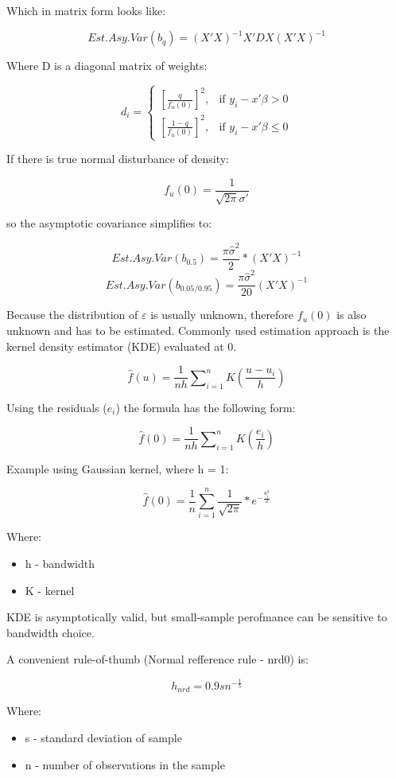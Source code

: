 \documentclass[]{article}
\begin{document}
	Which in matrix form looks like:
	
	$$ Est.Asy.Var(b_q) = (X'X)^{-1}X'DX(X'X)^{-1}  $$
	
	Where D is a diagonal matrix of weights:
	
		$$ d_i =
		\begin{cases}
			\left[\frac{q}{f_u(0)}\right]^2, & \text{if } y_i - x' \beta > 0 \\
			\left[\frac{1 - q}{f_u(0)}\right]^2, & \text{if } y_i - x' \beta \leq 0
		\end{cases} $$
	
	If there is true normal disturbance of density:
	
	$$ f_u(0) = \frac{1}{\sqrt{2 \pi} \sigma '} $$
	
	so the asymptotic covariance simplifies to:
	
	$$ Est.Asy.Var(b_{0.5}) = \frac{\pi\hat{\sigma}^2}{2}*(X'X)^{-1} $$
	$$ Est. Asy. Var(b_{0.05 / 0.95}) = \frac{\pi \hat{\sigma}^2}{20} (X'X)^{-1} $$
	
	Because the distribution of $ \varepsilon $ is usually unknown, therefore $f_u(0)$ is also unknown and has to be estimated. Commonly used estimation approach is the kernel density estimator (KDE) evaluated at 0.
	
	$$ \hat{f}(u) = \frac{1}{nh} \sum\nolimits_{i=1}^{n} K \left( \frac{u - u_i}{h} \right) $$
	
	Using the residuals ($e_i$) the formula has the following form:
	
	$$ \hat{f}(0) = \frac{1}{nh} \sum\nolimits_{i=1}^{n} K \left( \frac{e_i}{h} \right) $$
	
	Example using Gaussian kernel, where h = 1:
	
	$$ \hat{f}(0) = \frac{1}{n} \sum_{i=1}^{n} \frac{1}{\sqrt{2\pi}} * e^{-\frac{u_i^2}{2}} $$
	
	
	Where:
	\begin{itemize}
		\item [] h - bandwidth
		\item [] K - kernel
	\end{itemize}
	
	
	KDE is asymptotically valid, but small-sample perofmance can be sensitive to bandwidth choice.
	
	A convenient rule-of-thumb (Normal refference rule - nrd0) is:
	
	$$ h_{nrd} = 0.9 sn^{-\frac{1}{5}}	$$
	
	Where:
	\begin{itemize}
		\item [] s - standard deviation of sample
		\item [] n - number of observations in the sample
	\end{itemize}
	
\end{document}
